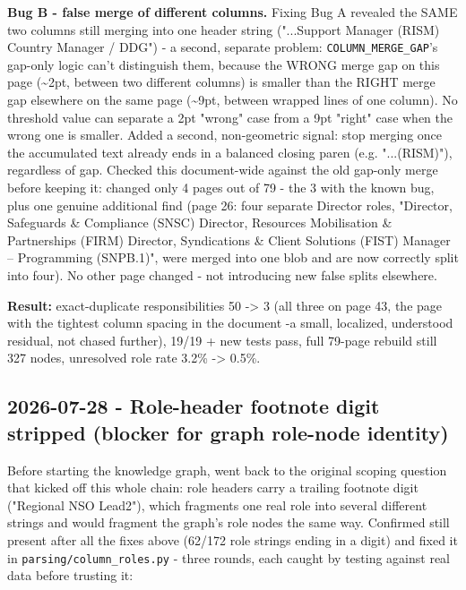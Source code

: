 \textbf{Bug B - false merge of different columns.} Fixing Bug A revealed the SAME two columns still merging into one header string ("...Support Manager (RISM) Country Manager / DDG") - a second, separate problem: \texttt{COLUMN\_\allowbreak{}MERGE\_\allowbreak{}GAP}'s gap-only logic can't distinguish them, because the WRONG merge gap on this page (\textasciitilde{}2pt, between two different columns) is smaller than the RIGHT merge gap elsewhere on the same page (\textasciitilde{}9pt, between wrapped lines of one column). No threshold value can separate a 2pt "wrong" case from a 9pt "right" case when the wrong one is smaller. Added a second, non-geometric signal: stop merging once the accumulated text already ends in a balanced closing paren (e.g. "...(RISM)"), regardless of gap. Checked this document-wide against the old gap-only merge before keeping it: changed only 4 pages out of 79 - the 3 with the known bug, plus one genuine additional find (page 26: four separate Director roles, "Director, Safeguards \& Compliance (SNSC) Director, Resources Mobilisation \& Partnerships (FIRM) Director, Syndications \& Client Solutions (FIST) Manager – Programming (SNPB.1)", were merged into one blob and are now correctly split into four). No other page changed - not introducing new false splits elsewhere.

\textbf{Result:} exact-duplicate responsibilities 50 -> 3 (all three on page 43, the page with the tightest column spacing in the document -a small, localized, understood residual, not chased further), 19/19 + new tests pass, full 79-page rebuild still 327 nodes, unresolved role rate 3.2\% -> 0.5\%.

\subsection*{2026-07-28 - Role-header footnote digit stripped (blocker for graph role-node identity)}
Before starting the knowledge graph, went back to the original scoping question that kicked off this whole chain: role headers carry a trailing footnote digit ("Regional NSO Lead2"), which fragments one real role into several different strings and would fragment the graph's role nodes the same way. Confirmed still present after all the fixes above (62/172 role strings ending in a digit) and fixed it in \texttt{parsing/\allowbreak{}column\_\allowbreak{}roles.py} - three rounds, each caught by testing against real data before trusting it:

